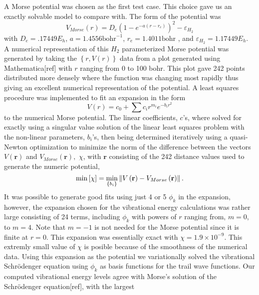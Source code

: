 \documentclass[12pt,thmsa]{article}
\begin{document}
A Morse potential was chosen as the first test case. This choice gave us an
exactly solvable model to compare with. The form of the potential was 
\begin{equation}
V_{Morse}\left( r\right) =D_e\left( 1-e^{-a\left( r-r_e\right) }\right)
^2-\varepsilon _{H_2}
\end{equation}
with $D_e=.17449E_h$, $a=1.4556\mathrm{bohr}^{-1}$, $r_e=1.4011\mathrm{bohr}$%
, and $\varepsilon _{H_2}=1.17449E_h.$ A numerical representation of this $%
H_2$ parameterized Morse potential was generated by taking the $\left\{
r,V\left( r\right) \right\} $ data from a plot generated using
Mathematica[ref] with $r$ ranging from 0 to 100 bohr. This plot gave 242
points distributed more densely where the function was changing most rapidly
thus giving an excellent numerical representation of the potential. A least
squares procedure was implemented to fit an expansion in the form 
\begin{equation}
V\left( r\right) =c_0+\sum c_ir^{m_i}e^{-b_ir^2}
\end{equation}
to the numerical Morse potential. The linear coefficients, $c$'s, where
solved for exactly using a singular value solution of the linear least
squares problem with the non-linear parameters, $b_i$'s, then being
determined iteratively using a quasi-Newton optimization to minimize the
norm of the difference between the vectors $V\left( \mathbf{r}\right) $ and $%
V_{Morse}\left( \mathbf{r}\right) ,$ $\chi $, with $\mathbf{r}$ consisting
of the 242 distance values used to generate the numeric potential, 
\begin{equation}
\min \left[ \chi \right] =\min_{\left\{ b_i\right\} }\left\| V\left( \mathbf{%
r}\right) -V_{Morse}\left( \mathbf{r}\right) \right\| .
\end{equation}
It was possible to generate good fits using just 4 or 5 $\phi _k$ in the
expansion, however, the expansion chosen for the vibrational energy
calculations was rather large consisting of 24 terms, including $\phi _k$
with powers of $r$ ranging from, $m=0$, to $m=4$. Note that $m=-1$ is not
needed for the Morse potential since it is finite at $r=0$. This expansion
was essentially exact with $\chi =1.9\times 10^{-9}$. This extremly small
value of $\chi $ is posible because of the smoothness of the numerical data.
Using this expansion as the potential we variationally solved the
vibrational Schr\"{o}denger equation using $\phi _k$ as basis functions for
the trail wave functions. Our computed vibrational energy levels agree with
Morse's solution of the Schr\"{o}denger equation[ref], with the largest
\end{document}

